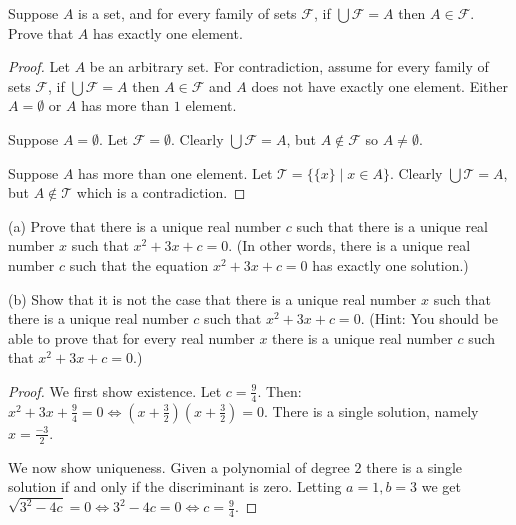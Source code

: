\begin{tcolorbox}[title=Problem 10, breakable]
    Suppose $A$ is a set, and for every family of sets $\mathcal{F}$,
    if $\bigcup \mathcal{F} = A$ then $A \in \mathcal{F}$. Prove that 
    $A$ has exactly one element.
\end{tcolorbox}

\begin{proof}
    Let $A$ be an arbitrary set.
    For contradiction, assume for every family of sets $\mathcal{F}$,
    if $\bigcup \mathcal{F} = A$ then $A \in \mathcal{F}$ and $A$ does not have exactly one element.
    Either $A = \emptyset$ or $A$ has more than $1$ element.

    Suppose $A = \emptyset$. Let $\mathcal{F} = \emptyset$. Clearly $\bigcup
        \mathcal{F} = A$, but $A \not \in \mathcal{F}$ so $A \not = \emptyset$.

    Suppose $A$ has more than one element. Let $\mathcal{T} = \{\{x\} \mid x \in
        A\}$. Clearly $\bigcup \mathcal{T} = A$, but $A \not \in \mathcal{T}$ which is
    a contradiction.
\end{proof}

\begin{tcolorbox}[title=Problem 13, breakable]
    (a) Prove that there is a unique real number $c$ such that there 
    is a unique real number $x$ such that $x^2 + 3x + c = 0$.
    (In other words, there is a unique real number $c$ such that 
    the equation $x^2 + 3x + c = 0$ has exactly one solution.)

    (b) Show that it is not the case that there is a unique real number 
    $x$ such that there is a unique real number $c$ such that 
    $x^2 + 3x + c = 0$. (Hint: You should be able to prove that 
    for every real number $x$ there is a unique real number $c$
    such that $x^2 + 3x + c = 0$.)
\end{tcolorbox}

\begin{proof}
    We first show existence.
    Let $c = \frac{9}{4}$.
    Then: $x^2 + 3x + \frac{9}{4} = 0 \iff (x + \frac{3}{2})(x + \frac{3}{2}) = 0$.
    There is a single solution, namely $x = \frac{-3}{2}$.

    We now show uniqueness. Given a polynomial of degree $2$ there is a single
    solution if and only if the discriminant is zero. Letting $a = 1, b = 3$ we get
    $\sqrt{3^2 - 4c} = 0 \iff 3^2 - 4c = 0 \iff c = \frac{9}{4}$.
\end{proof}

